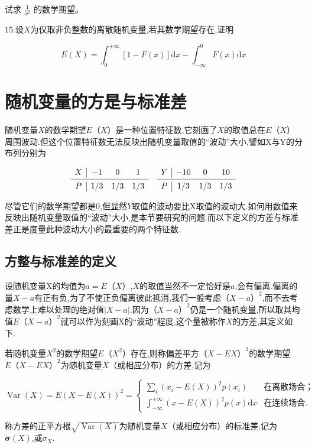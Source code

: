 试求 $\frac{1}{x^{2}}$ 的数学期望。

15.设$ X $为仅取非负整数的离散随机变量,若其数学期望存在,证明

\[
E(X)=\int_{0}^{+\infty}[1-F(x)] \mathrm{d} x-\int_{-\infty}^{0} F(x) \mathrm{d} x
\]

\section{随机变量的方是与标准差}


随机变量$ X $的数学期望$ E（X） $是一种位置特征数,它刻画了$ X $的取值总在$ E（X $）周围波动.但这个位置特征数无法反映出随机变量取值的“波动”大小,譬如X与Y的分布列分别为

\[
\begin{array}{c|ccccc|ccc}
X     & -1    & 0     & 1     &       & Y     & -10   & 0     & 10 \\
\cmidrule{1-4}\cmidrule{6-9}    P     & 1/3   & 1/3   & 1/3   &       & P     & 1/3   & 1/3   & 1/3 \\
\end{array}\]

尽管它们的数学期望都是0,但显然$ Y $取值的波动要比X取值的波动大.如何用数值来反映出随机变量取值的“波动”大小,是本节要研究的问题.而以下定义的方差与标准差正是度量此种波动大小的最重要的两个特征数.

\subsection{方整与标准差的定义}

设随机变量X的均值为$ a=E（X） $,$ X $的取值当然不一定恰好是$ a $,会有偏离.偏离的量$ X-a $有正有负,为了不使正负偏离彼此抵消,我们一般考虑$ （X-a）^2 $,而不去考虑数学上难以处理的绝对值$ |X-a| $.因为$ （X-a）^2 $仍是一个随机变量,所以取其均值$ E（X-a）^2 $就可以作为刻画X的“波动”程度,这个量被称作$ X $的方差,其定义如下.
\begin{definition}{}{}
	若随机变量$ X^2 $的数学期望$ E（X^2） $存在,则称偏差平方$ （X-EX）^2 $的数学期望$ E（X-EX）^2 $为随机变量$ X $（或相应分布）的方差,记为
	
	\begin{equation}
	\operatorname{Var}(X)=E(X-E(X))^{2}=\left\{\begin{array}{ll}
	{\sum_{i}\left(x_{i}-E(X)\right)^{2} p\left(x_{i}\right)} &{\text{在离散场合；}}\\
	{\int_{-\infty}^{+\infty}(x-E(X))^{2} p(x) \mathrm{d} x} &{\text{在连续场合.}}
	\end{array}\right. \label{eq:2.3.1}
	\end{equation}
	
	称方差的正平方根$\sqrt{\operatorname{Var}(X)}$为随机变量$ X $（或相应分布）的标准差,记为$\boldsymbol{\sigma}(X)$,或$\sigma_X$.
\end{definition}



